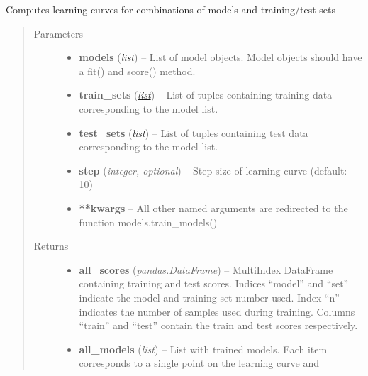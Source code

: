 \documentclass[letterpaper,10pt,english]{sphinxmanual}
\begin{document}

\begin{fulllineitems}
\label{classification:flamingo.classification.test.compute_learning_curve}
Computes learning curves for combinations of models and training/test sets
\begin{quote}\begin{description}
\item[{Parameters}] \leavevmode\begin{itemize}
\item {} 
\textbf{models} (\href{http://docs.python.org/library/functions.html\#list}{\emph{list}}) -- List of model objects. Model objects should have a fit() and score() method.

\item {} 
\textbf{train\_sets} (\href{http://docs.python.org/library/functions.html\#list}{\emph{list}}) -- List of tuples containing training data corresponding to the model list.

\item {} 
\textbf{test\_sets} (\href{http://docs.python.org/library/functions.html\#list}{\emph{list}}) -- List of tuples containing test data corresponding to the model list.

\item {} 
\textbf{step} (\emph{integer, optional}) -- Step size of learning curve (default: 10)

\item {} 
\textbf{**kwargs} -- 
All other named arguments are redirected to the function models.train\_models()


\end{itemize}

\item[{Returns}] \leavevmode
\begin{itemize}
\item {} 
\textbf{all\_scores} (\emph{pandas.DataFrame}) --
MultiIndex DataFrame containing training and test scores.
Indices ``model'' and ``set'' indicate the model and training set number used.
Index ``n'' indicates the number of samples used during training.
Columns ``train'' and ``test'' contain the train and test scores respectively.

\item {} 
\textbf{all\_models} (\emph{list}) --
List with trained models.
Each item corresponds to a single point on the learning curve and
\begin{quote}


\end{quote}
\end{itemize}
\end{description}
\end{quote}
\end{fulllineitems}
\end{document}
